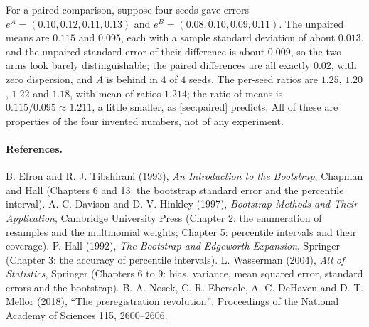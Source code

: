 For a paired comparison, suppose four seeds gave errors $e^A=(0.10,0.12,0.11,0.13)$
and $e^B=(0.08,0.10,0.09,0.11)$. The unpaired means are $0.115$ and $0.095$, each with
a sample standard deviation of about $0.013$, and the unpaired standard error of their
difference is about $0.009$, so the two arms look barely distinguishable; the paired
differences are all exactly $0.02$, with zero dispersion, and $A$ is behind in $4$ of
$4$ seeds. The per-seed ratios are $1.25$, $1.20$, $1.22$ and $1.18$, with mean of ratios
$1.214$; the ratio of means is $0.115/0.095\approx1.211$, a little smaller, as
\cref{sec:paired} predicts. All of these are properties of the four invented numbers,
not of any experiment.


\paragraph{References.}
B. Efron and R. J. Tibshirani (1993), \emph{An Introduction to the Bootstrap}, Chapman
and Hall (Chapters 6 and 13: the bootstrap standard error and the percentile interval).
A. C. Davison and D. V. Hinkley (1997), \emph{Bootstrap Methods and Their Application},
Cambridge University Press (Chapter 2: the enumeration of resamples and the
multinomial weights; Chapter 5: percentile intervals and their coverage).
P. Hall (1992), \emph{The Bootstrap and Edgeworth Expansion}, Springer (Chapter 3: the
accuracy of percentile intervals).
L. Wasserman (2004), \emph{All of Statistics}, Springer (Chapters 6 to 9: bias,
variance, mean squared error, standard errors and the bootstrap).
B. A. Nosek, C. R. Ebersole, A. C. DeHaven and D. T. Mellor (2018), ``The
preregistration revolution'', Proceedings of the National Academy of Sciences 115,
2600--2606.
